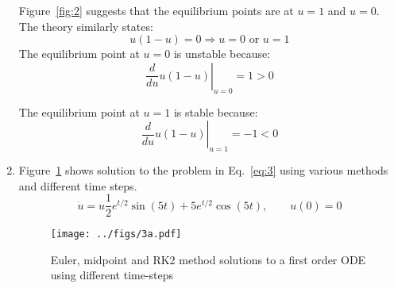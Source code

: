 \documentclass[12pt,a4]{article}
\begin{document}
\begin{enumerate}
     Figure~\ref{fig:2} suggests that the equilibrium points are at $u = 1$ and $u = 0$.
     The theory similarly states:
     \begin{equation*}
       u(1 - u) = 0 \Rightarrow u = 0 \text{ or } u = 1
     \end{equation*}
     The equilibrium point at $u = 0$ is unstable because:
     \begin{equation*}
       \left.\frac{d}{d u}u(1 - u) \right|_{u = 0} = 1 > 0
     \end{equation*}

     The equilibrium point at $u = 1$ is stable because:
     \begin{equation*}
       \left.\frac{d}{d u}u(1 - u) \right|_{u = 1} = -1 < 0
     \end{equation*}

  \item
    Figure~\ref{fig:3a} shows solution to the problem in Eq.~\ref{eq:3} using various methods and different time steps.
    \begin{equation}
      \dot u = u \frac{1}{2} e^{t / 2} \sin(5 t) + 5 e ^{t / 2} \cos(5 t), \qquad u(0) = 0
      \label{eq:3}
    \end{equation}
    \begin{figure}[H]
      \centering
      \texttt{[image: ../figs/3a.pdf]}
      \caption{Euler, midpoint and RK2 method solutions to a first order ODE using different time-steps}
      \label{fig:3a}
    \end{figure}
\end{enumerate}
\end{document}
